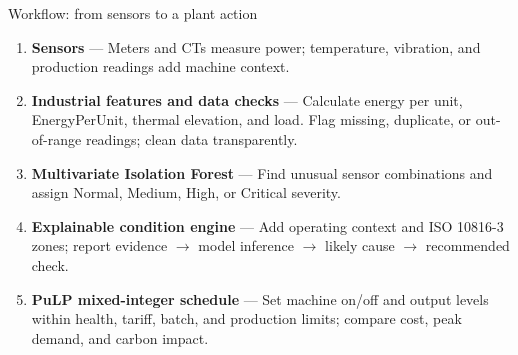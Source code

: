 \documentclass[aspectratio=169,10pt]{beamer}
\begin{document}
\begin{frame}{Workflow: from sensors to a plant action}
\normalsize
\begin{enumerate}\setlength\itemsep{3pt}
  \item[\textcolor{Teal}{\bfseries 1}] \textbf{Sensors} --- Meters and CTs measure power; temperature, vibration, and production readings add machine context.
  \item[\textcolor{Teal}{\bfseries 2}] \textbf{Industrial features and data checks} --- Calculate energy per unit, EnergyPerUnit, thermal elevation, and load. Flag missing, duplicate, or out-of-range readings; clean data transparently.
  \item[\textcolor{Teal}{\bfseries 3}] \textbf{Multivariate Isolation Forest} --- Find unusual sensor combinations and assign Normal, Medium, High, or Critical severity.
  \item[\textcolor{Teal}{\bfseries 4}] \textbf{Explainable condition engine} --- Add operating context and ISO 10816-3 zones; report evidence $\rightarrow$ model inference $\rightarrow$ likely cause $\rightarrow$ recommended check.
  \item[\textcolor{Teal}{\bfseries 5}] \textbf{PuLP mixed-integer schedule} --- Set machine on/off and output levels within health, tariff, batch, and production limits; compare cost, peak demand, and carbon impact.
\end{enumerate}
\end{frame}
\end{document}
